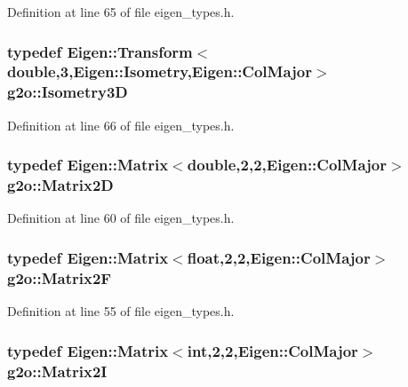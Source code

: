 Definition at line 65 of file eigen\+\_\+types.\+h.

\subsubsection[{\texorpdfstring{Isometry3D}{Isometry3D}}]{\setlength{\rightskip}{0pt plus 5cm}typedef Eigen\+::\+Transform$<$double,3,Eigen\+::\+Isometry,Eigen\+::\+Col\+Major$>$ {\bf g2o\+::\+Isometry3D}}\hypertarget{namespaceg2o_af8f6c8f7db82618f6bab6bbe448806eb}{}\label{namespaceg2o_af8f6c8f7db82618f6bab6bbe448806eb}


Definition at line 66 of file eigen\+\_\+types.\+h.

\subsubsection[{\texorpdfstring{Matrix2D}{Matrix2D}}]{\setlength{\rightskip}{0pt plus 5cm}typedef Eigen\+::\+Matrix$<$double,2,2,Eigen\+::\+Col\+Major$>$ {\bf g2o\+::\+Matrix2D}}\hypertarget{namespaceg2o_ab45dbd73bc096222cf5688ea45b04eba}{}\label{namespaceg2o_ab45dbd73bc096222cf5688ea45b04eba}


Definition at line 60 of file eigen\+\_\+types.\+h.

\subsubsection[{\texorpdfstring{Matrix2F}{Matrix2F}}]{\setlength{\rightskip}{0pt plus 5cm}typedef Eigen\+::\+Matrix$<$float,2,2,Eigen\+::\+Col\+Major$>$ {\bf g2o\+::\+Matrix2F}}\hypertarget{namespaceg2o_a07b62708470b4ff9ade2f9609e30310c}{}\label{namespaceg2o_a07b62708470b4ff9ade2f9609e30310c}


Definition at line 55 of file eigen\+\_\+types.\+h.

\subsubsection[{\texorpdfstring{Matrix2I}{Matrix2I}}]{\setlength{\rightskip}{0pt plus 5cm}typedef Eigen\+::\+Matrix$<$int,2,2,Eigen\+::\+Col\+Major$>$ {\bf g2o\+::\+Matrix2I}}\hypertarget{namespaceg2o_ac9319963099ff600cf7c6251d7e937e1}{}\label{namespaceg2o_ac9319963099ff600cf7c6251d7e937e1}


